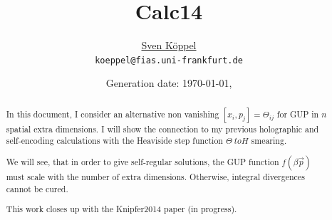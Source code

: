 \documentclass[10pt,a4paper, fleqn]{article}
\title{\vspace{-9ex} Calc14 \vspace{-1ex}} %
\author{\small %
\href{https://itp.uni-frankfurt.de/~koeppel}{Sven Köppel} \\
\small \texttt{koeppel@fias.uni-frankfurt.de}}
\date{\small Generation date: \today, \currenttime}
\begin{document}
\maketitle

\renewcommand{\d}{\mathrm{d}}
\newcommand{\dd}[2]{\frac{\mathrm{d} #1}{\mathrm{d} #2}}
\newcommand{\pp}[2]{\frac{\partial #1}{\partial #2}}
\renewcommand{\L}{L_P}
\newcommand{\pr}{p_r}
\newcommand{\psenk}{p_\perp}
\newcommand{\ebenso}{\biggl( ~ \therefore ~ \biggr) }
\newcommand{\metrik}[1]{\d s^2 = \left( #1 \right) \d t^2 \left( #1 \right)^{-1} \d r^2 + r^2 \d \Omega_{D-2}^2 }
\newcommand{\winkel}{r^2 \d \Omega^2}
\newcommand{\dann}{$\rightarrow~$}
\newcommand{\CA}{ {\cal A}}
\newcommand{\C}[1]{ {\cal #1}}
\newcommand{\mn}{_{\mu\nu}}

\newcommand*{\mathcolor}{}
\def\mathcolor#1#{\mathcoloraux{#1}}
\newcommand*{\mathcoloraux}[3]{%
  \protect\leavevmode
  \begingroup
    \color#1{#2}#3%
  \endgroup
}
\newcommand{\redmin}{\mathcolor{red}{-}}
\newcommand{\redplus}{\mathcolor{red}{+}}
\newcommand{\pn}{\mathcolor{OliveGreen}{+ n}}
\newcommand{\n}{ {\mathcolor{OliveGreen}{n}} }

\begin{multicols}{2}
\begin{abstract}
In this document, I consider an alternative non vanishing
$[x_i, p_j] = \Theta_{ij}$ for GUP in $n$ spatial
extra dimensions. I will show the connection to my previous
holographic and self-encoding calculations with the
Heaviside step function $\Theta \ to H$ smearing.

We will see, that in order to give self-regular solutions, the
GUP function $f(\beta \vec p)$ must scale with the number of
extra dimensions. Otherwise, integral divergences cannot be
cured.

This work closes up with  the Knipfer2014 paper (in progress).
\end{abstract}
\vfill
\columnbreak
\tableofcontents
\end{multicols}
\end{document}
